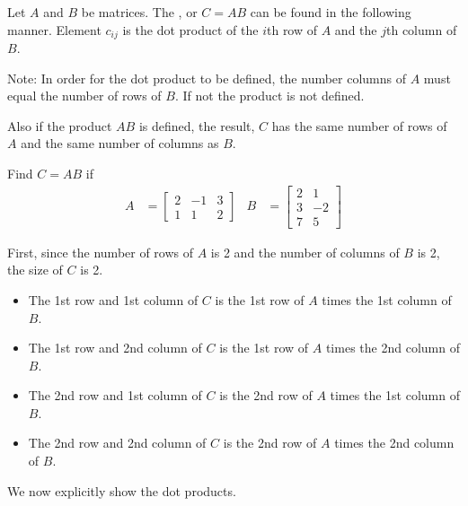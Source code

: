 \begin{definition}
Let $A$ and $B$ be matrices.  The , or $C=AB$ can be found in the following manner.  Element $c_{ij}$ is the dot product of the $i$th row of $A$ and the $j$th column of $B$.   

Note:  In order for the dot product to be defined, the number columns of $A$ must equal the number of rows of $B$.  If not the product is not defined.   
\end{definition}

Also if the product $AB$ is defined, the result, $C$ has the same number of rows of $A$ and the same number of columns as $B$.  

\begin{example}
Find $C=AB$ if
%
\begin{align*}
A & = \begin{bmatrix}
2 & -1 & 3 \\ 1 & 1 & 2 
\end{bmatrix}
&
B & = \begin{bmatrix}
2 & 1 \\ 3 & -2 \\ 7 & 5
\end{bmatrix}
\end{align*}

\solution

First, since the number of rows of $A$ is 2 and the number of columns of $B$ is 2, the size of $C$ is 2. 

\begin{itemize}
\item The 1st row and 1st column of $C$ is the 1st row of $A$ times the 1st column of $B$.   
\item The 1st row and 2nd column of $C$ is the 1st row of $A$ times the 2nd column of $B$.   
\item The 2nd row and 1st column of $C$ is the 2nd row of $A$ times the 1st column of $B$.   
\item The 2nd row and 2nd column of $C$ is the 2nd row of $A$ times the 2nd column of $B$.   

\end{itemize}

We now explicitly show the dot products.  


\end{example}

